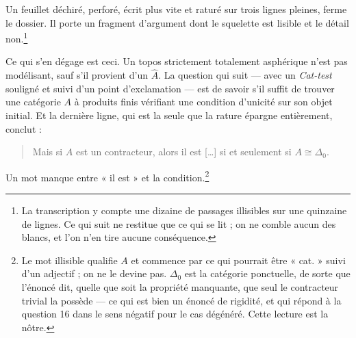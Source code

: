 \documentclass[11pt,a4paper]{article}
\begin{document}
Un feuillet déchiré, perforé, écrit plus vite et raturé sur trois lignes
pleines, ferme le dossier. Il porte un fragment d'argument dont le squelette est
lisible et le détail non.\footnote{La transcription y compte une dizaine de
passages illisibles sur une quinzaine de lignes. Ce qui suit ne restitue que ce
qui se lit ; on ne comble aucun des blancs, et l'on n'en tire aucune
conséquence.}

Ce qui s'en dégage est ceci. Un topos strictement totalement asphérique n'est
pas modélisant, sauf s'il provient d'un $\hat{A}$. La question qui suit --- avec
un \emph{Cat-test} souligné et suivi d'un point d'exclamation --- est de savoir
s'il suffit de trouver une catégorie $A$ à produits finis vérifiant une
condition d'unicité sur son objet initial. Et la dernière ligne, qui est la
seule que la rature épargne entièrement, conclut :

\begin{quote}
Mais si $A$ est un contracteur, alors il est [\ldots] si et seulement si
$A \cong \Delta_{0}$.
\end{quote}

Un mot manque entre « il est » et la condition.\footnote{Le mot illisible
qualifie $A$ et commence par ce qui pourrait être « cat. » suivi d'un
adjectif ; on ne le devine pas. $\Delta_{0}$ est la catégorie ponctuelle, de
sorte que l'énoncé dit, quelle que soit la propriété manquante, que seul le
contracteur trivial la possède --- ce qui est bien un énoncé de rigidité, et
qui répond à la question 16 dans le sens négatif pour le cas dégénéré. Cette
lecture est la nôtre.}
\end{document}
